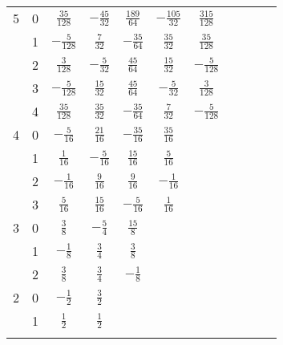 \begin{table}
\begin{center}
\begin{tabular}{ccccccccccc}
      5  &  0  &  $ \frac{  35}{  128}$  &  $-\frac{  45}{  32}$  &  $ \frac{  189}{  64}$  &  $-\frac{  105}{  32}$  &  $ \frac{   315}{  128}$  \\ \addlinespace
         &  1  &  $-\frac{   5}{  128}$  &  $ \frac{   7}{  32}$  &  $-\frac{   35}{  64}$  &  $ \frac{   35}{  32}$  &  $ \frac{    35}{  128}$  \\ \addlinespace
         &  2  &  $ \frac{   3}{  128}$  &  $-\frac{   5}{  32}$  &  $ \frac{   45}{  64}$  &  $ \frac{   15}{  32}$  &  $-\frac{     5}{  128}$  \\ \addlinespace
         &  3  &  $-\frac{   5}{  128}$  &  $ \frac{  15}{  32}$  &  $ \frac{   45}{  64}$  &  $-\frac{    5}{  32}$  &  $ \frac{     3}{  128}$  \\ \addlinespace
         &  4  &  $ \frac{  35}{  128}$  &  $ \frac{  35}{  32}$  &  $-\frac{   35}{  64}$  &  $ \frac{    7}{  32}$  &  $-\frac{     5}{  128}$  \\ \addlinespace

      4  &  0  &  $-\frac{   5}{   16}$  &  $ \frac{  21}{  16}$  &  $-\frac{   35}{  16}$  &  $ \frac{   35}{  16}$  \\ \addlinespace
         &  1  &  $ \frac{   1}{   16}$  &  $-\frac{   5}{  16}$  &  $ \frac{   15}{  16}$  &  $ \frac{    5}{  16}$  \\ \addlinespace
         &  2  &  $-\frac{   1}{   16}$  &  $ \frac{   9}{  16}$  &  $ \frac{    9}{  16}$  &  $-\frac{    1}{  16}$  \\ \addlinespace
         &  3  &  $ \frac{   5}{   16}$  &  $ \frac{  15}{  16}$  &  $-\frac{    5}{  16}$  &  $ \frac{    1}{  16}$  \\ \addlinespace

      3  &  0  &  $ \frac{   3}{    8}$  &  $-\frac{   5}{   4}$  &  $ \frac{   15}{   8}$  \\ \addlinespace
         &  1  &  $-\frac{   1}{    8}$  &  $ \frac{   3}{   4}$  &  $ \frac{    3}{   8}$  \\ \addlinespace
         &  2  &  $ \frac{   3}{    8}$  &  $ \frac{   3}{   4}$  &  $-\frac{    1}{   8}$  \\ \addlinespace

      2  &  0  &  $-\frac{   1}{    2}$  &  $ \frac{   3}{   2}$  \\ \addlinespace
         &  1  &  $ \frac{   1}{    2}$  &  $ \frac{   1}{   2}$  \\ \addlinespace
      \bottomrule
    \end{tabular}
  \end{center}
\end{table}

